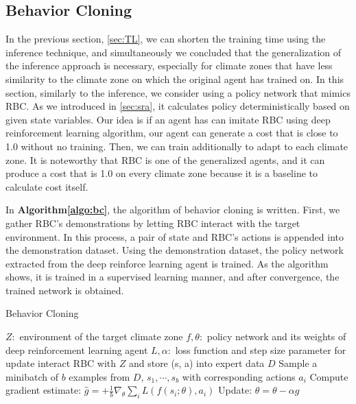\documentclass{article}
\begin{document}
\subsection{Behavior Cloning}
In the previous section, \ref{sec:TL}, we can shorten the training time using the inference technique, and simultaneously we concluded that the generalization of the inference approach is necessary, especially for climate zones that have less similarity to the climate zone on which the original agent has trained on. In this section, similarly to the inference, we consider using a policy network that mimics RBC. As we introduced in \ref{sec:sra}, it calculates policy deterministically based on given state variables. Our idea is if an agent has can imitate RBC using deep reinforcement learning algorithm, our agent can generate a cost that is close to 1.0 without no training. Then, we can train additionally to adapt to each climate zone. It is noteworthy that RBC is one of the generalized agents, and it can produce a cost that is 1.0 on every climate zone because it is a baseline to calculate cost itself.

In \textbf{Algorithm\ref{algo:bc}}, the algorithm of behavior cloning is written. First, we gather RBC's demonstrations by letting RBC interact with the target environment. In this process, a pair of state and RBC's actions is appended into the demonstration dataset. Using the demonstration dataset, the policy network extracted from the deep reinforce learning agent is trained. As the algorithm shows, it is trained in a supervised learning manner, and after convergence, the trained network is obtained.

\begin{algorithm}
    \caption{Behavior Cloning}
    \label{algo:bc}
  \begin{algorithmic}[1]
    \REQUIRE $Z:$ environment of the target climate zone
    \REQUIRE $f, \theta:$ policy network and its weights of deep reinforcement learning agent
    \REQUIRE $L, \alpha:$ loss function and step size parameter for update
    \STATE interact RBC with $Z$ and store (s, a) into expert data $D$
        \STATE Sample a minibatch of $b$ examples from $D$, ${s_1, \cdots, s_b}$ with corresponding actions $a_i$
        \STATE Compute gradient estimate: $\hat{g} = +\frac{1}{b}\nabla_\theta \sum_i L(f(s_i;\theta), a_i)$
        \STATE Update: $\theta = \theta - \alpha \hat{g}$
    \ENDWHILE
  \end{algorithmic}
\end{algorithm}
\end{document}
